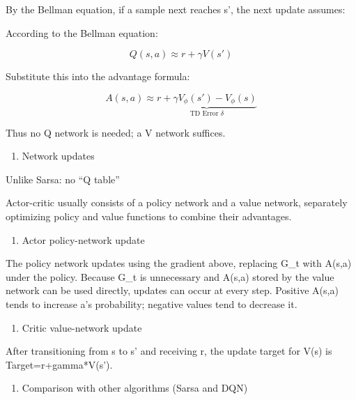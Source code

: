 By the Bellman equation, if a sample next reaches s', the next update assumes:

According to the Bellman equation:

\[
Q(s,a)\approx r+\gamma V(s')
\]

Substitute this into the advantage formula:

\[
A(s,a)\approx \underbrace{r+\gamma V_\phi(s')-V_\phi(s)}_{\text{TD Error }\delta}
\]

Thus no Q network is needed; a V network suffices.

\begin{enumerate}
\def\labelenumi{\arabic{enumi}.}
\setcounter{enumi}{2}
\tightlist
\item
  Network updates
\end{enumerate}

Unlike Sarsa: no ``Q table''

Actor-critic usually consists of a policy network and a value network, separately optimizing policy and value functions to combine their advantages.

\begin{enumerate}
\def\labelenumi{(\arabic{enumi})}
\tightlist
\item
  Actor policy-network update
\end{enumerate}

The policy network updates using the gradient above, replacing G\_t with A(s,a) under the policy. Because G\_t is unnecessary and A(s,a) stored by the value network can be used directly, updates can occur at every step. Positive A(s,a) tends to increase a's probability; negative values tend to decrease it.

\begin{enumerate}
\def\labelenumi{(\arabic{enumi})}
\setcounter{enumi}{1}
\tightlist
\item
  Critic value-network update
\end{enumerate}

After transitioning from s to s' and receiving r, the update target for V(s) is Target=r+gamma*V(s').

\begin{enumerate}
\def\labelenumi{\arabic{enumi}.}
\setcounter{enumi}{3}
\tightlist
\item
  Comparison with other algorithms (Sarsa and DQN)
\end{enumerate}

